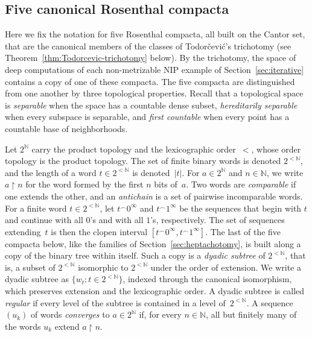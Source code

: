 \documentclass[psamsfonts]{amsart}
\theoremstyle{definition}
\theoremstyle{remark}
\newcommand{\NIP}{\text{NIP}}
\newcommand{\restr}{{\restriction}}
\numberwithin{equation}{section}
\begin{document}
\subsection{Five canonical Rosenthal compacta}
\label{sec:five-compacta}
Here we fix the notation for five Rosenthal compacta, all built on the Cantor set, that are the canonical members of the classes of Todorčević’s trichotomy (see Theorem~\ref{thm:Todorcevic-trichotomy} below).
By the trichotomy, the space of deep computations of each non-metrizable $\NIP$ example of Section~\ref{sec:iterative} contains a copy of one of these compacta.
The five compacta are distinguished from one another by three topological properties.
Recall that a topological space is \emph{separable} when the space has a countable dense subset, \emph{hereditarily separable} when every subspace is separable, and \emph{first countable} when every point has a countable base of neighborhoods.

Let $2^{\mathbb{N}}$ carry the product topology and the lexicographic order~$<$, whose order topology is the product topology.
The set of finite binary words is denoted $2^{<\mathbb{N}}$, and the length of a word $t\in2^{<\mathbb{N}}$ is denoted~$|t|$.
For $a\in2^{\mathbb{N}}$ and $n\in\mathbb{N}$, we write $a\restr n$ for the word formed by the first $n$ bits of~$a$.
Two words are \emph{comparable} if one extends the other, and an \emph{antichain} is a set of pairwise incomparable words.
For a finite word $t\in2^{<\mathbb{N}}$, let $t^\frown0^\infty$ and $t^\frown1^\infty$ be the sequences that begin with $t$ and continue with all $0$’s and with all $1$’s, respectively.
The set of sequences extending~$t$ is then the clopen interval $[t^\frown0^\infty,t^\frown1^\infty]$.
The last of the five compacta below, like the families of Section~\ref{sec:heptachotomy}, is built along a copy of the binary tree within itself.
Such a copy is a \emph{dyadic subtree} of $2^{<\mathbb{N}}$, that is, a subset of $2^{<\mathbb{N}}$ isomorphic to $2^{<\mathbb{N}}$ under the order of extension.
We write a dyadic subtree as $\{w_t:t\in2^{<\mathbb{N}}\}$, indexed through the canonical isomorphism, which preserves extension and the lexicographic order.
A dyadic subtree is called \emph{regular} if every level of the subtree is contained in a level of~$2^{<\mathbb{N}}$.
A sequence $(u_k)$ of words \emph{converges} to $a\in2^{\mathbb{N}}$ if, for every $n\in\mathbb{N}$, all but finitely many of the words $u_k$ extend $a\restr n$.
\end{document}
